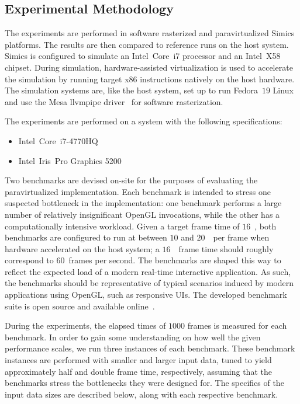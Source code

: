 \subsection{Experimental Methodology}
\label{sec:experimentalmethodology}
The experiments are performed in software rasterized and paravirtualized Simics platforms.
The results are then compared to reference runs on the host system.
Simics is configured to simulate an Intel\circledR ~Core\texttrademark ~i7 processor and an Intel\circledR ~X58 chipset.
During simulation, hardware-assisted virtualization is used to accelerate the simulation by running target x86 instructions natively on the host hardware.
The simulation systems are, like the host system, set up to run Fedora~$19$ Linux and use the Mesa llvmpipe driver~ for software rasterization.

The experiments are performed on a system with the following specifications:
\begin{itemize}
\item Intel\circledR\ Core\texttrademark\ i7-4770HQ
\item Intel\circledR\ Iris\texttrademark\ Pro Graphics 5200
\end{itemize}

Two benchmarks are devised on-site for the purposes of evaluating the paravirtualized implementation.
Each benchmark is intended to stress one suspected bottleneck in the implementation: one benchmark performs a large number of relatively insignificant OpenGL invocations, while the other has a computationally intensive workload.
Given a target frame time of $16$~\milli\second , both benchmarks are configured to run at between $10$ and $20$~\milli\second\ per frame when hardware accelerated on the host system; a $16$~\milli\second\ frame time should roughly correspond to $60$~frames per second.
The benchmarks are shaped this way to reflect the expected load of a modern real-time interactive application.
As such, the benchmarks should be representative of typical scenarios induced by modern applications using OpenGL, such as responsive UIs.
The developed benchmark suite is open source and available online~.

During the experiments, the elapsed times of $1000$ frames is measured for each benchmark.
In order to gain some understanding on how well the given performance scales, we run three instances of each benchmark.
These benchmark instances are performed with smaller and larger input data, tuned to yield approximately half and double frame time, respectively, assuming that the benchmarks stress the bottlenecks they were designed for.
The specifics of the input data sizes are described below, along with each respective benchmark.

